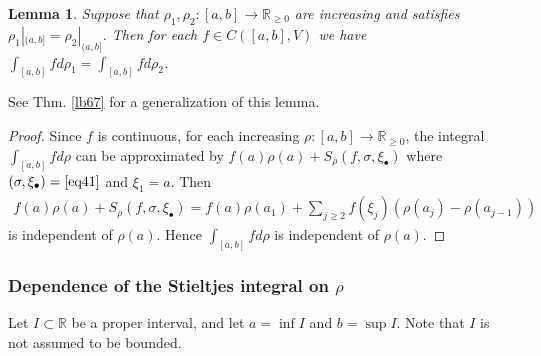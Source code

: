 \documentclass[12pt,b5paper,notitlepage]{article}
\theoremstyle{definition}
\newtheorem{rem}[df]{Remark}
\theoremstyle{plain}
\newtheorem{lm}[df]{Lemma}
\newcommand{\blt}{\bullet}
\newcommand{\Rbb}{\mathbb R}
\newcommand{\dps}{\displaystyle}
\numberwithin{equation}{section}
\begin{document}

\begin{lm}\label{lb69}
Suppose that $\rho_1,\rho_2:[a,b]\rightarrow\Rbb_{\geq0}$ are increasing and satisfies $\rho_1|_{(a,b]}=\rho_2|_{(a,b]}$. Then for each $f\in C([a,b],V)$ we have $\dps\int_{[a,b]}fd\rho_1=\int_{[a,b]}fd\rho_2$.
\end{lm}

See Thm. \ref{lb67} for a generalization of this lemma.

\begin{proof}
Since $f$ is continuous, for each increasing $\rho:[a,b]\rightarrow\Rbb_{\geq0}$, the integral $\int_{[a,b]}fd\rho$ can be approximated by $f(a)\rho(a)+S_\rho(f,\sigma,\xi_\blt)$ where $(\sigma,\xi_\blt)=\eqref{eq41}$ and $\xi_1=a$. Then
\begin{align*}
f(a)\rho(a)+S_\rho(f,\sigma,\xi_\blt)=f(a)\rho(a_1)+\sum_{j\geq2}f(\xi_j)(\rho(a_j)-\rho(a_{j-1}))
\end{align*}
is independent of $\rho(a)$. Hence $\int_{[a,b]}fd\rho$ is independent of $\rho(a)$.
\end{proof}



\begin{comment}
\begin{rem}
The Stieltjes integral can be defined on unbounded intervals. For example, if $\rho:[a,+\infty)\rightarrow\Rbb$ is \textit{bounded} and increasing, for $f\in C_0([a,+\infty),V)$, we define
\begin{align*}
\int_{[a,+\infty)} fd\rho=\lim_{\lambda\rightarrow+\infty}\int_{[a,\lambda]} fd\rho
\end{align*}
where the RHS converges. Similarly, we can define $\int_{-\infty}^{+\infty}fd\rho$ for bounded increasing $\rho:\Rbb\rightarrow\Rbb$ and $f\in C_0(\Rbb,V)$.
\end{rem}
\end{comment}





\subsubsection{Dependence of the Stieltjes integral on $\rho$}


Let $I\subset\Rbb$ be a proper interval, and let $a=\inf I$ and $b=\sup I$. Note that $I$ is not assumed to be bounded. 
\end{document}
